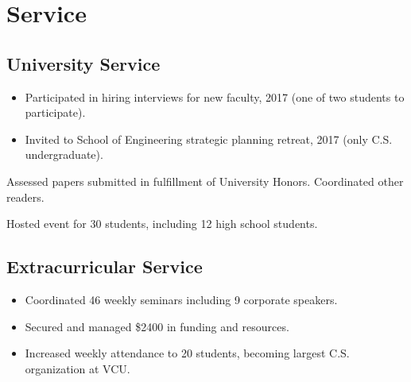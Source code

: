 \documentclass[11pt,letterpaper,serif]{moderncv}
\begin{document}
\section{Service}
\subsection{University Service}
{
	\begin{adjustwidth}{.25in}{}
		\begin{itemize}%
			\item Participated in hiring interviews for new faculty, 2017 (one of two students to participate).
			\item Invited to School of Engineering strategic planning retreat, 2017 (only C.S. undergraduate).
		\end{itemize}
	\end{adjustwidth}
}

{
	\begin{adjustwidth}{.25in}{}
		Assessed papers submitted in fulfillment of University Honors. Coordinated other readers.
	\end{adjustwidth}
}




{
	\begin{adjustwidth}{.25in}{}
		Hosted event for 30 students, including 12 high school students.
	\end{adjustwidth}
}

\subsection{Extracurricular Service}
{
	\begin{adjustwidth}{.25in}{}
		\begin{itemize}
			\item Coordinated 46 weekly seminars including 9 corporate speakers.
			\item Secured and managed \$2400 in funding and resources.
			\item Increased weekly attendance to 20 students, becoming largest C.S. organization at VCU.
		\end{itemize}
	\end{adjustwidth}
}
\end{document}
